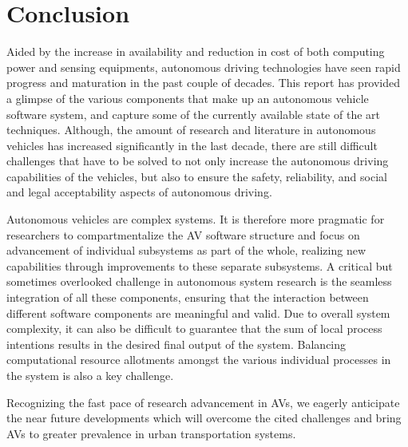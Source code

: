 \section{Conclusion}

Aided by the increase in availability and reduction in cost of both computing
power and sensing equipments, autonomous driving technologies have seen rapid
progress and maturation in the past couple of decades. This report has provided
a glimpse of the various components that make up an autonomous vehicle software
system, and capture some of the currently available state of the art techniques.
Although, the amount of research and literature in autonomous vehicles has increased
significantly in the last decade, there are still difficult challenges
that have to be solved to not only increase the autonomous driving capabilities
of the vehicles, but also to ensure the safety, reliability, and social and
legal acceptability aspects of autonomous driving.

Autonomous vehicles are complex systems. It is therefore more pragmatic for
researchers to compartmentalize the AV software structure and focus on
advancement of individual subsystems as part of the whole, realizing new
capabilities through improvements to these separate subsystems. A critical but
sometimes overlooked challenge in autonomous system research is the seamless
integration of all these components, ensuring that the interaction between
different software components are meaningful and valid. Due to overall system
complexity, it can also be difficult to guarantee that the sum of local process
intentions results in the desired final output of the system. Balancing
computational resource allotments amongst the various individual processes in
the system is also a key challenge.

Recognizing the fast pace of research advancement in AVs, we eagerly anticipate
the near future developments which will overcome the cited challenges and bring
AVs to greater prevalence in urban transportation systems.